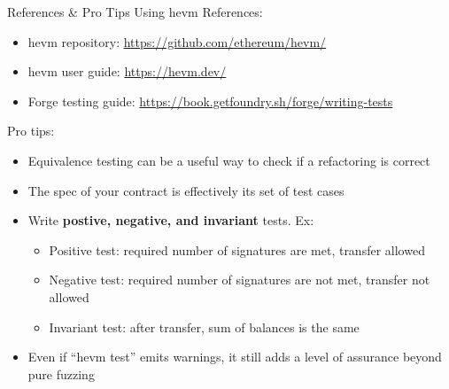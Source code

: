 \documentclass[aspectratio=169]{beamer}
\begin{document}
\begin{frame}[fragile=singleslide]{References \& Pro Tips Using hevm}
References:
\begin{itemize}
    \item hevm repository: \url{https://github.com/ethereum/hevm/}
    \item hevm user guide: \url{https://hevm.dev/}
    \item Forge testing guide: \url{https://book.getfoundry.sh/forge/writing-tests}
\end{itemize}

\bigskip

Pro tips:
\begin{itemize}
    \item Equivalence testing can be a useful way to check if a refactoring is correct
    \item The spec of your contract is effectively its set of test cases
    \item Write \textbf{postive, negative, and invariant} tests. Ex:
        \begin{itemize}
            \item Positive test: required number of signatures are met, transfer allowed
            \item Negative test: required number of signatures are not met, transfer not allowed
            \item Invariant test: after transfer, sum of balances is the same
        \end{itemize}
    \item Even if ``hevm test'' emits warnings, it still adds a level of assurance beyond pure fuzzing
\end{itemize}


\end{frame}



%
\end{document}
